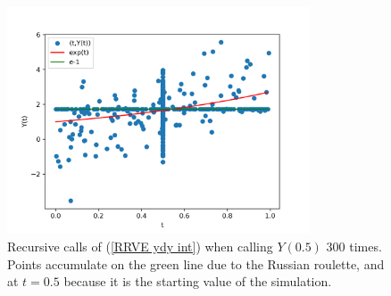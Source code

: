 \documentclass[a4paper,12pt]{article}
\begin{document}
\begin{example}[$y'=y$ average condition]
    \begin{figure}[h!]
        \centering
        \includegraphics[width=0.8\textwidth]{plots/ydy int.png}
        \caption{Recursive calls of (\ref{RRVE ydy int}) when
            calling $Y(0.5)$ $300$ times. Points accumulate on
            the green line due to the Russian roulette,
            and at  $t=0.5$ because it is the starting
            value of the simulation.
        }
        \label{fig:ydy int}
    \end{figure}

\end{example}
\end{document}
